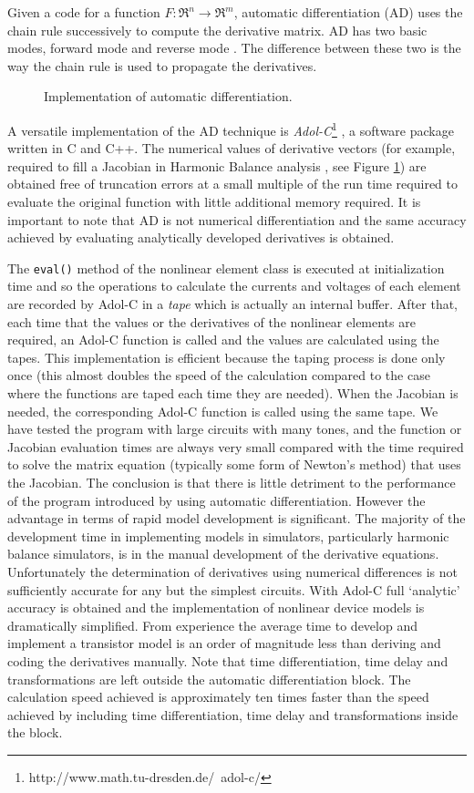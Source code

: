 Given a code for a function $F : \Re^n \rightarrow \Re^m$,
automatic differentiation (AD) uses the chain rule successively to
compute the derivative matrix. AD has two basic modes, forward
mode and reverse mode \cite{coleman}. The difference between these
two is the way the chain rule is used to propagate the
derivatives.

%
\begin{figure}[htpb]{}
\caption{Implementation of automatic differentiation.}
\label{fig:adolc}
\end{figure}
%
A versatile implementation of the AD technique is
\emph{Adol-C}\footnote{http://www.math.tu-dresden.de/~adol-c/}
\cite{adol-c:96}, a software package written in C and C++.  The
numerical values of derivative vectors (for example, required to
fill a Jacobian in Harmonic Balance analysis \cite{svhb}, see
Figure \ref{fig:adolc}) are obtained free of truncation errors at
a small multiple of the run time required to evaluate the original
function with little additional memory required.  It is important
to note that AD is not numerical differentiation and the same
accuracy achieved by evaluating analytically developed derivatives
is obtained.

The {\tt eval()} method of the nonlinear element class is executed
at initialization time and so the operations to calculate the
currents and voltages of each element are recorded by Adol-C in a
\emph{tape} which is actually an internal buffer. After that, each
time that the values or the derivatives of the nonlinear elements
are required, an Adol-C function is called and the values are
calculated using the tapes.  This implementation is efficient
because the taping process is done only once (this almost doubles
the speed of the calculation compared to the case where the
functions are taped each time they are needed).  When the Jacobian
is needed, the corresponding Adol-C function is called using the
same tape. We have tested the program with large circuits with
many tones, and the function or Jacobian evaluation times are
always very small compared with the time required to solve the
matrix equation (typically some form of Newton's method) that uses
the Jacobian. The conclusion is that there is little detriment to
the performance of the program introduced by using automatic
differentiation.  However the advantage in terms of rapid model
development is significant.  The majority of the development time
in implementing models in simulators, particularly harmonic
balance simulators, is in the manual development of the derivative
equations. Unfortunately the determination of derivatives using
numerical differences is not sufficiently accurate for any but the
simplest circuits. With Adol-C full `analytic' accuracy is
obtained and the implementation of nonlinear device models is
dramatically simplified. From experience the average time to
develop and implement a transistor model is an order of magnitude
less than deriving and coding the derivatives manually. Note that
time differentiation, time delay and transformations are left
outside the automatic differentiation block. The calculation speed
achieved is approximately ten times faster than the speed achieved
by including time differentiation, time delay and transformations
inside the block.

